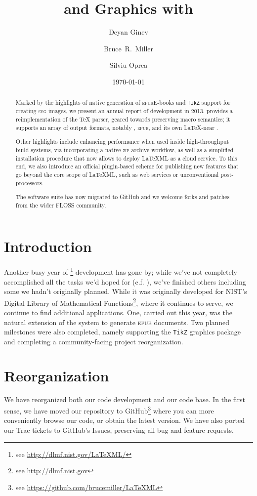 \documentclass{llncs}
\title{\ebooks and Graphics with \LaTeXML}
\author{Deyan Ginev\inst{1} \and Bruce~R.~Miller\inst{2} \and Silviu Oprea\inst{3}}
\institute{Computer Science, Jacobs University Bremen, Germany
 \and National Institute of Standards and Technology, Gaithersburg, MD, USA
 \and Department of Computer Science, University of Oxford, Oxford, UK}
\date{\today}
\def\ebooks{\mbox{E-books}\xspace}
\def\epub{\textsc{epub}\xspace}
\def\svg{\textsc{svg}\xspace}
\def\zip{\textsc{zip}\xspace}
\def\tikz{\texttt{TikZ}\xspace}
\begin{document}
\maketitle
\begin{abstract} 
Marked by the highlights of native generation of \epub \ebooks and \tikz support for creating \svg images, we present an annual report of {\LaTeXML} development in 2013. {\LaTeXML} provides a reimplementation of the {\TeX} parser, geared towards preserving macro semantics;
it supports an array of output formats, notably , \epub, {\XHTML} and its own \LaTeX-near \XML.

Other highlights include enhancing performance when used inside high-throughput build systems, via incorporating a native \zip archive workflow, as well as a simplified installation procedure that now allows to deploy LaTeXML as a cloud service. To this end, we also introduce an official plugin-based scheme for publishing new features that go beyond the core scope of LaTeXML, such as web services or unconventional post-processors.

The software suite has now migrated to GitHub and we welcome forks and patches from the wider FLOSS community.
\end{abstract}

\section{Introduction}
Another busy year of {\LaTeXML}\footnote{see \url{http://dlmf.nist.gov/LaTeXML/}} development has gone by;
while we've not completely accomplished all the tasks we'd hoped for (c.f. \cite{GinMil:latexmlCICM13}),
we've finished others including some we hadn't originally planned.
While it was originally developed for NIST's Digital Library of Mathematical Functions\footnote{see \url{http://dlmf.nist.gov}},
where it continues to serve, we continue to find additional applications.
One, carried out this year, was the natural extension of the system to generate \epub documents. 
Two planned milestones were also completed, namely supporting the \tikz graphics package and 
completing a community-facing project reorganization.

\section{Reorganization}\label{reorganization}
We have reorganized both our code development and our code base.
In the first sense, we have moved our repository to GitHub\footnote{see \url{https://github.com/brucemiller/LaTeXML}} 
where you can more conveniently browse our code, or obtain the latest version.
We have also ported our Trac tickets to GitHub's Issues,
preserving all bug and feature requests.
\end{document}
